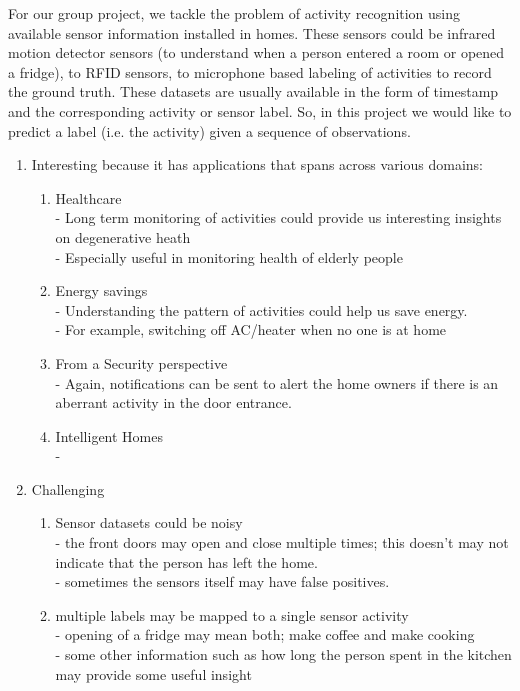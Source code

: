 \documentclass[11pt, oneside]{article}   	%
\begin{document}
For our group project, we tackle the problem of activity recognition using available sensor information installed in homes. 
These sensors could be infrared motion detector sensors (to understand when a person entered a room or opened a fridge),
to RFID sensors, to microphone based labeling of activities to record the ground truth. These datasets 
are usually available in the form of timestamp and the corresponding activity or sensor label. 
So, in this project we would like to predict a label (i.e. the activity) given a sequence of observations. 

\begin{enumerate}
 
\item Interesting because it has applications that spans across various domains:
	\begin{enumerate}
	\item Healthcare\\
		- Long term monitoring of activities could provide us interesting insights on degenerative heath \\
		- Especially useful in monitoring health of elderly people\\
	\item  Energy savings \\
		- Understanding the pattern of activities could help us save energy. \\
		- For example, switching off AC/heater when no one is at home \\
	\item  From a Security perspective\\
		- Again, notifications can be sent to alert the home owners if there is an aberrant activity in the door entrance. \\
	\item  Intelligent Homes\\
		- 
	\end{enumerate}
\item Challenging
		\begin{enumerate}
	\item Sensor datasets could be noisy\\
		- the front doors may open and close multiple times; this doesn't may not indicate that the person has left the home.\\
		- sometimes the sensors itself may have false positives. \\
		
	\item multiple labels may be mapped to a single sensor activity\\
		- opening of a fridge may mean both; make coffee and make cooking\\
		- some other information such as how long the person spent in the kitchen may provide some useful insight\\
		

\end{enumerate}
\end{enumerate}
\end{document}
